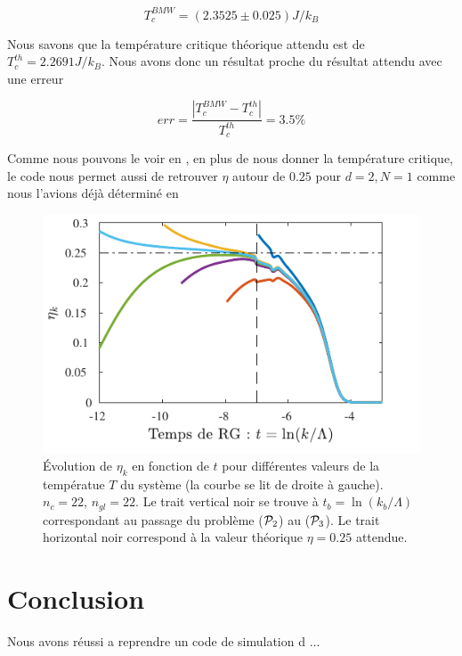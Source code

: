 \documentclass[10pt]{article}
\begin{document}
\begin{multicols}{2}
\begin{equation}
T_c^{BMW}  = (2.3525 \pm 0.025)J/k_B
\end{equation}

Nous savons que la température critique théorique attendu est de $T_c^{th} = 2.2691 J/k_B$. Nous avons donc un résultat proche du résultat attendu avec une erreur 

\begin{equation}
	err = \frac{ |T_c^{BMW} - T_c^{th}|}{T_c^{th}} = 3.5 \%
\end{equation}


Comme nous pouvons le voir en , en plus de nous donner la température critique, le code nous permet aussi de retrouver $\eta$ autour de $0.25$ pour $d=2, N=1$ comme nous l'avions déjà déterminé en 

\begin{figure}[H]
\begin{center}
	\includegraphics[width=0.95\columnwidth]{MesuRes.pdf}
\end{center}
\caption{Évolution de $\eta_k$ en fonction de $t$ pour différentes valeurs de la températue $T$ du système (la courbe se lit de droite à gauche). $n_c=22$, $n_{gl} = 22$.  Le trait vertical noir se trouve à $t_b = \ln(k_b/\Lambda)$ correspondant au passage du problème ($\mathcal{P}_2$) au ($\mathcal{P}_3$). Le trait horizontal noir correspond à la valeur théorique $\eta = 0.25$ attendue. }
\label{fig:etaMesu}
\end{figure}


\section{Conclusion}

Nous avons réussi a reprendre un code de simulation d ...

\vfill

\pagebreak





\end{multicols}
\end{document}
